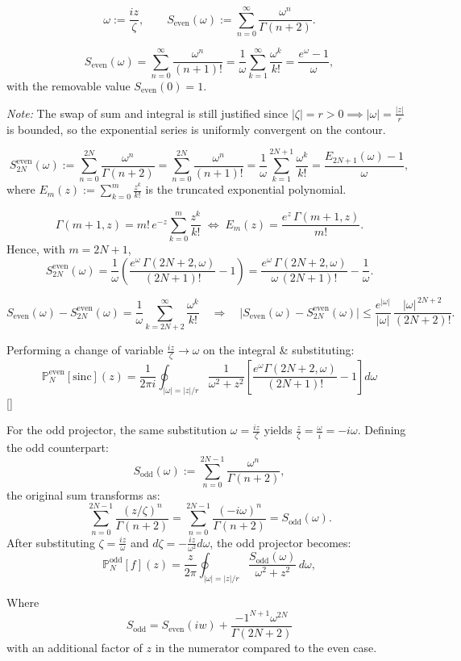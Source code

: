 \[
\omega := \frac{i z}{\zeta},\qquad
S_{\text{even}}(\omega) := \sum_{n=0}^{\infty} \frac{\omega^{n}}{\Gamma(n+2)}.
\]

\[
S_{\text{even}}(\omega)
= \sum_{n=0}^{\infty} \frac{\omega^{n}}{(n+1)!}
= \frac{1}{\omega}\sum_{k=1}^{\infty}\frac{\omega^{k}}{k!}
= \frac{e^{\omega}-1}{\omega},
\]
with the removable value \(S_{\text{even}}(0)=1\).
\medskip

\noindent \emph{Note:} The swap of sum and integral is still justified since $\left|\zeta\right| = r > 0 \implies \left|\omega\right| = \frac{\left|z\right|}{r}$ is bounded, so the exponential series is uniformly convergent on the contour.
\medskip

\[
S_{2N}^{\text{even}}(\omega) := \sum_{n=0}^{2N}\frac{\omega^{n}}{\Gamma(n+2)}
= \sum_{n=0}^{2N}\frac{\omega^{n}}{(n+1)!}
= \frac{1}{\omega}\sum_{k=1}^{2N+1}\frac{\omega^{k}}{k!}
= \frac{E_{2N+1}(\omega)-1}{\omega},
\]
where \(E_m(z):=\sum_{k=0}^{m}\frac{z^{k}}{k!}\) is the truncated exponential polynomial.

\[
\Gamma(m+1,z)=m!\,e^{-z}\sum_{k=0}^{m}\frac{z^{k}}{k!}
\;\Longleftrightarrow\;
E_m(z)=\frac{e^{z}\,\Gamma(m+1,z)}{m!}.
\]
Hence, with \(m=2N+1\),
\[
S_{2N}^{\text{even}}(\omega)
= \frac{1}{\omega}\!\left(\frac{e^{\omega}\,\Gamma(2N+2,\omega)}{(2N+1)!}-1\right)
= \frac{e^{\omega}\,\Gamma(2N+2,\omega)}{\omega\,(2N+1)!}-\frac{1}{\omega}.
\]

\[
S_{\text{even}}(\omega)-S_{2N}^{\text{even}}(\omega)
= \frac{1}{\omega}\sum_{k=2N+2}^{\infty}\frac{\omega^{k}}{k!}
\quad\Rightarrow\quad
\bigl|S_{\text{even}}(\omega)-S_{2N}^{\text{even}}(\omega)\bigr|
\le \frac{e^{|\omega|}}{|\omega|}\,\frac{|\omega|^{\,2N+2}}{(2N+2)!}.
\]

Performing a change of variable $\frac{iz}{\zeta} \to \omega$ on the integral \& substituting:
\[
\mathbb{P}_N^{\text{even}}[\mathrm{sinc}](z) = \frac{1}{2\pi i}\oint_{|\omega| = |z|/r} \frac{1}{\omega^2 + z^2}
\left[\frac{e^\omega \Gamma(2N+2, \omega)}{(2N+1)!}- 1\right] d\omega
\]\eqref{}

\begin{remark}
For the odd projector, the same substitution $\omega = \frac{iz}{\zeta}$ yields $\frac{z}{\zeta} = \frac{\omega}{i} = -i\omega$. Defining the odd counterpart:
\[
S_{\text{odd}}(\omega) := \sum_{n=0}^{2N-1} \frac{\omega^n}{\Gamma(n+2)},
\]
the original sum transforms as:
\[
\sum_{n=0}^{2N-1} \frac{(z/\zeta)^n}{\Gamma(n+2)} = \sum_{n=0}^{2N-1} \frac{(-i\omega)^n}{\Gamma(n+2)} = S_{\text{odd}}(\omega).
\]
After substituting $\zeta = \frac{iz}{\omega}$ and $d\zeta = -\frac{iz}{\omega^2} d\omega$, the odd projector becomes:
\[
\mathbb{P}_N^{\text{odd}}[f](z) = \frac{z}{2\pi}\oint_{|\omega|=|z|/r} \frac{S_{\text{odd}}(\omega)}{\omega^2+z^2} \, d\omega,
\]

Where
\[
S_{\text{odd}} = S_{\text{even}}(iw) + \frac{-1^{N+1}\omega^{2N}}{\Gamma(2N + 2)}
\]
with an additional factor of $z$ in the numerator compared to the even case.
\end{remark}

